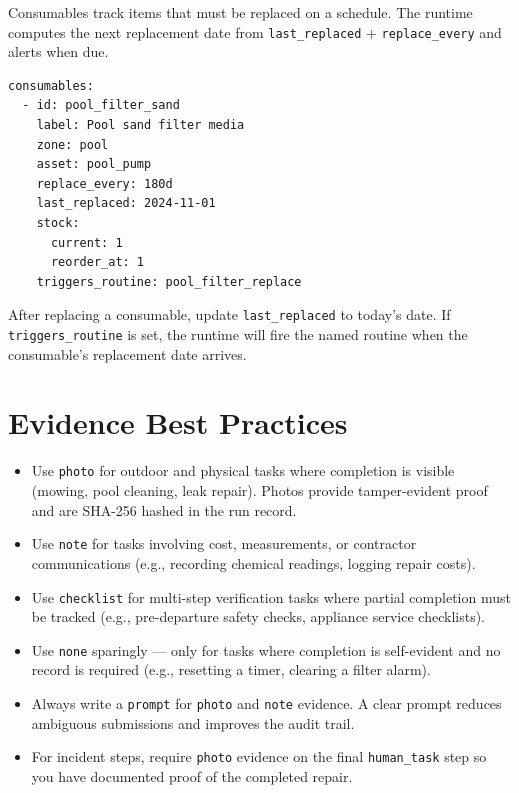Consumables track items that must be replaced on a schedule. The runtime computes the next
replacement date from \texttt{last\_replaced} + \texttt{replace\_every} and alerts when due.

\begin{verbatim}
consumables:
  - id: pool_filter_sand
    label: Pool sand filter media
    zone: pool
    asset: pool_pump
    replace_every: 180d
    last_replaced: 2024-11-01
    stock:
      current: 1
      reorder_at: 1
    triggers_routine: pool_filter_replace
\end{verbatim}

After replacing a consumable, update \texttt{last\_replaced} to today's date. If
\texttt{triggers\_routine} is set, the runtime will fire the named routine when the
consumable's replacement date arrives.

\section{Evidence Best Practices}
\label{sec:authoring-evidence}

\begin{itemize}
  \item Use \texttt{photo} for outdoor and physical tasks where completion is visible
        (mowing, pool cleaning, leak repair). Photos provide tamper-evident proof and are
        SHA-256 hashed in the run record.
  \item Use \texttt{note} for tasks involving cost, measurements, or contractor
        communications (e.g., recording chemical readings, logging repair costs).
  \item Use \texttt{checklist} for multi-step verification tasks where partial completion
        must be tracked (e.g., pre-departure safety checks, appliance service checklists).
  \item Use \texttt{none} sparingly --- only for tasks where completion is self-evident and
        no record is required (e.g., resetting a timer, clearing a filter alarm).
  \item Always write a \texttt{prompt} for \texttt{photo} and \texttt{note} evidence. A
        clear prompt reduces ambiguous submissions and improves the audit trail.
  \item For incident steps, require \texttt{photo} evidence on the final \texttt{human\_task}
        step so you have documented proof of the completed repair.
\end{itemize}

